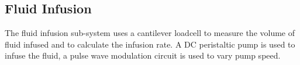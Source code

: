\subsection{Fluid Infusion}

The fluid infusion sub-system uses a cantilever loadcell to measure the volume of fluid infused and to calculate the infusion rate. A DC peristaltic pump is used to infuse the fluid, a pulse wave modulation circuit is used to vary pump speed.